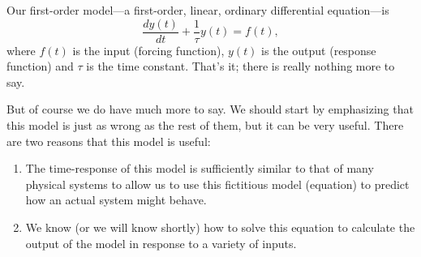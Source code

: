 Our \gls{first-order model}---a first-order, linear, ordinary differential equation---is 
\begin{equation}
\label{e:first}
\frac{dy(t)}{dt} + \frac{1}{\tau}y(t) = f(t),
\end{equation}
where $f(t)$ is the input (forcing function), $y(t)$ is the output (response function) and $\tau$ is the time constant.  That's it; there is really nothing more to say.  

But of course we do have much more to say.  We should start by emphasizing that this model is just as wrong as the rest of them, but it can be very useful.  There are two reasons that this model is useful:
\begin{enumerate}
\item The time-response of this model is sufficiently similar to that of many physical systems to allow us to use this fictitious model (equation) to predict how an actual system might behave.
\item We know (or we will know shortly) how to solve this equation to calculate the output of the model in response to a variety of inputs.
\end{enumerate}







